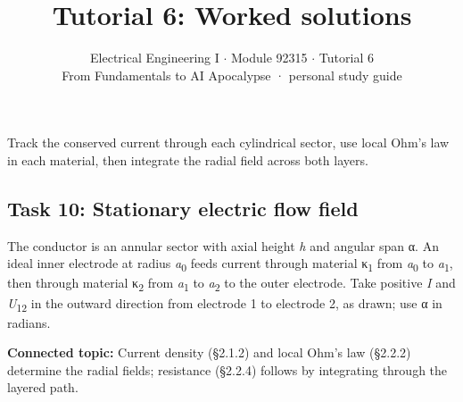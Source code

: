 \documentclass[11pt]{article}
\title{\sffamily\bfseries\color{FAUblue}Tutorial 6: Worked solutions}
\author{Electrical Engineering I \ensuremath{\cdot} Module 92315 \ensuremath{\cdot} Tutorial 6\\[2pt]\small From Fundamentals to AI Apocalypse · personal study guide}
\date{}
\begin{document}
\maketitle
\begingroup\footnotesize\setlength{\parskip}{0pt}\tableofcontents\endgroup
\clearpage

{\large Track the conserved current through each cylindrical sector, use local Ohm’s law in each material, then integrate the radial field across both layers.}


\begin{keepsection}
\section{Task 10: Stationary electric flow field}

The conductor is an annular sector with axial height \textit{h} and angular span α. An ideal inner electrode at radius \textit{a}\textsubscript{0} feeds current through material κ\textsubscript{1} from \textit{a}\textsubscript{0} to \textit{a}\textsubscript{1}, then through material κ\textsubscript{2} from \textit{a}\textsubscript{1} to \textit{a}\textsubscript{2} to the outer electrode. Take positive \textit{I} and \textit{U}\textsubscript{12} in the outward direction from electrode 1 to electrode 2, as drawn; use α in radians.

\textbf{Connected topic:} Current density (§2.1.2) and local Ohm’s law (§2.2.2) determine the radial fields; resistance (§2.2.4) follows by integrating through the layered path.


\end{keepsection}
\end{document}
